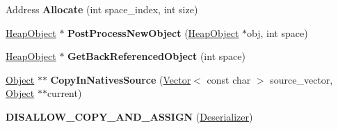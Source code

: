 \begin{DoxyCompactItemize}
\item 
Address {\bfseries Allocate} (int space\+\_\+index, int size)\hypertarget{classv8_1_1internal_1_1_deserializer_a4968267f2d68e189b65e0a1dd0118058}{}\label{classv8_1_1internal_1_1_deserializer_a4968267f2d68e189b65e0a1dd0118058}

\item 
\hyperlink{classv8_1_1internal_1_1_heap_object}{Heap\+Object} $\ast$ {\bfseries Post\+Process\+New\+Object} (\hyperlink{classv8_1_1internal_1_1_heap_object}{Heap\+Object} $\ast$obj, int space)\hypertarget{classv8_1_1internal_1_1_deserializer_a89f82de2d9b9bc9ae3f734a02e453d64}{}\label{classv8_1_1internal_1_1_deserializer_a89f82de2d9b9bc9ae3f734a02e453d64}

\item 
\hyperlink{classv8_1_1internal_1_1_heap_object}{Heap\+Object} $\ast$ {\bfseries Get\+Back\+Referenced\+Object} (int space)\hypertarget{classv8_1_1internal_1_1_deserializer_a5d171b0586015f2e9988cac14149d41b}{}\label{classv8_1_1internal_1_1_deserializer_a5d171b0586015f2e9988cac14149d41b}

\item 
\hyperlink{classv8_1_1internal_1_1_object}{Object} $\ast$$\ast$ {\bfseries Copy\+In\+Natives\+Source} (\hyperlink{classv8_1_1internal_1_1_vector}{Vector}$<$ const char $>$ source\+\_\+vector, \hyperlink{classv8_1_1internal_1_1_object}{Object} $\ast$$\ast$current)\hypertarget{classv8_1_1internal_1_1_deserializer_afdab67ab0dbe07ba04e947dd1516b8f9}{}\label{classv8_1_1internal_1_1_deserializer_afdab67ab0dbe07ba04e947dd1516b8f9}

\item 
{\bfseries D\+I\+S\+A\+L\+L\+O\+W\+\_\+\+C\+O\+P\+Y\+\_\+\+A\+N\+D\+\_\+\+A\+S\+S\+I\+GN} (\hyperlink{classv8_1_1internal_1_1_deserializer}{Deserializer})\hypertarget{classv8_1_1internal_1_1_deserializer_a71816f5867e5ad03c871bcba40e1d7ea}{}\label{classv8_1_1internal_1_1_deserializer_a71816f5867e5ad03c871bcba40e1d7ea}

\end{DoxyCompactItemize}
